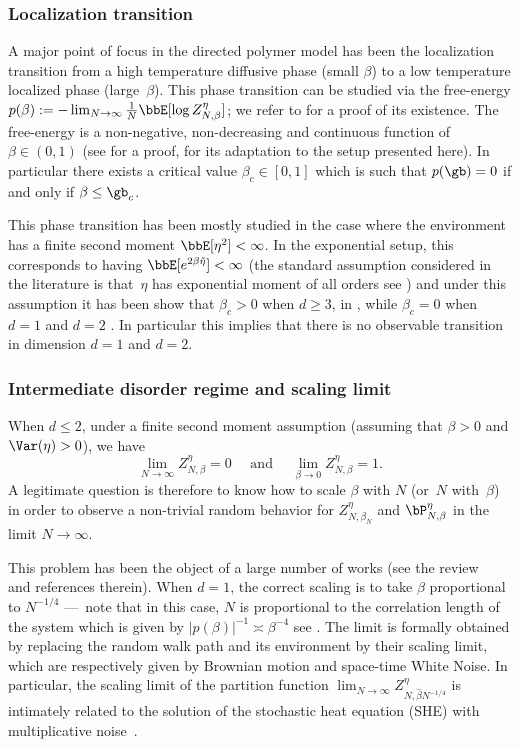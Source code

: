 \subsubsection*{Localization transition}

A major point of focus in the directed polymer model has been the localization transition from a high temperature diffusive phase (small $\beta$) to a low temperature localized phase (large~$\beta$).
This phase transition can be studied via the free-energy $p(\beta):= -\lim_{N\to \infty}\frac{1}{N} \bbE [\log Z^{\eta}_{N,\beta}]$;
we refer to \cite[Prop.\,2.5]{CSY03} for a proof of its existence.
The free-energy is a non-negative, non-decreasing and continuous function of $\beta\in (0,1)$
(see \cite[Th.\,3.2]{CSY06} for a proof, \cite[Th.\,A.1]{Vi19} for its adaptation to the setup presented here). In particular there exists a critical value $\beta_c\in [0,1]$ which is such that $p(\gb)=0$ if and only if $\beta \leq \gb_c$.

This phase transition has been mostly studied in the case where the environment has a finite second moment
$\bbE[\eta^2]<\infty$. In the exponential setup, this corresponds to having $\bbE[e^{2\beta\tilde \eta}]<\infty$ (the standard assumption considered in the literature is that~$\eta$ has exponential moment of all orders see \eg \cite{AKQ10})
and under this assumption it has been show that $\beta_c>0$ when $d\ge 3$, in \cite{Bol89,IS88}, while $\beta_c=0$ when $d=1$ \cite{CV06} and $d=2$ \cite{Lac10pol}. In particular this implies that there is no observable transition in dimension $d=1$ and $d=2$.

\subsubsection*{Intermediate disorder regime and scaling limit}

When $d \le 2$, under a finite second moment assumption (assuming that $\beta>0$ and $\Var(\eta)>0$), we have
\begin{equation}%
\lim_{N \to \infty} Z^{\eta}_{N,\beta}= 0 \quad \text{ and } \quad
\lim_{\beta\to 0} Z^{\eta}_{N,\beta}=1.
\end{equation}
A legitimate question is therefore to know how
to scale $\beta$ with $N$ (or~$N$ with~$\beta$) in order to observe a non-trivial random behavior for $Z^{\eta}_{N,\beta_N}$ and $\bP^{\eta}_{N,\beta}$ in the limit $N\to\infty$.

This problem has been the object of a large number of works \cite{AKQ10, CSZ14, CSZ13} (see the review~\cite{CSZreview} and references therein). When $d=1$, the correct scaling is to take $\beta$ proportional to $N^{-1/4}$
---~note that in this case, $N$ is proportional to the correlation length of the system which is given by $|p(\beta)|^{-1}\asymp \beta^{-4}$ see \cite{AY15, Nak16}.
The limit is formally obtained by replacing the random walk path and its environment by their scaling limit, which are respectively given by Brownian motion and space-time White Noise.
In particular, the scaling limit of the partition function $\lim_{N\to \infty} Z^{\eta}_{N, \hat \beta N^{-1/4}}$ is intimately related to the solution of the stochastic heat equation (SHE) with multiplicative noise~\cite{CB95}.

